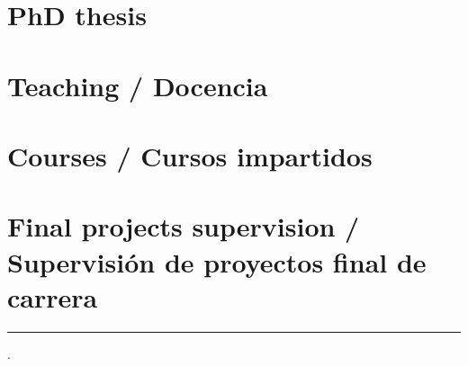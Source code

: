 \documentclass{article}
\begin{document}
\section{PhD thesis}


\section{Teaching / Docencia}


\renewcommand{\refname}{}
\section{Courses / Cursos impartidos}


\renewcommand{\refname}{}
\section{Final projects supervision / Supervisión de proyectos final de carrera}


\hrule
\currenttime.
\end{document}
